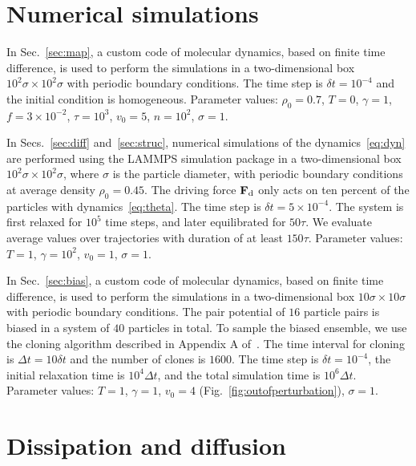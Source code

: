 \documentclass[superscriptaddress, twocolumn, prx, longbibliography, nofootinbib]{revtex4-1}
\begin{document}


\appendix

\section{Numerical simulations}\label{app:simu}

In Sec.~\ref{sec:map}, a custom code of molecular dynamics, based on finite time difference, is used to perform the simulations in a two-dimensional box $10^2\sigma\times 10^2\sigma$ with periodic boundary conditions. The time step is $\delta t = 10^{-4}$ and the initial condition is homogeneous. Parameter values: $\rho_0=0.7$, $T=0$, $\gamma=1$, $f=3\times 10^{-2}$, $\tau=10^3$, $v_0=5$, $n=10^2$, $\sigma=1$.


In Secs.~\ref{sec:diff} and~\ref{sec:struc}, numerical simulations of the dynamics~\eqref{eq:dyn} are performed using the LAMMPS simulation package in a two-dimensional box $10^2\sigma\times 10^2\sigma$, where $\sigma$ is the particle diameter, with periodic boundary conditions at average density $\rho_0=0.45$. The driving force ${\bf F}_{\rm d}$ only acts on ten percent of the particles with dynamics~\eqref{eq:theta}. The time step is $\delta t = 5\times 10^{-4}$. The system is first relaxed for $10^5$ time steps, and later equilibrated for $50\tau$. We evaluate average values over trajectories with duration of at least $150\tau$. Parameter values: $T=1$, $\gamma=10^2$, $v_0=1$, $\sigma=1$.


In Sec.~\ref{sec:bias}, a custom code of molecular dynamics, based on finite time difference, is used to perform the simulations in a two-dimensional box $10\sigma\times 10\sigma$ with periodic boundary conditions. The pair potential of $16$ particle pairs is biased in a system of $40$ particles in total. To sample the biased ensemble, we use the cloning algorithm described in Appendix A of~\cite{Nemoto2016}. The time interval for cloning is $\Delta t = 10 \delta t$ and the number of clones is $1600$. The time step is $\delta t = 10^{-4}$, the initial relaxation time is $10^4\Delta t$, and the total simulation time is $10^6 \Delta t$. Parameter values: $T=1$, $\gamma=1$, $v_0=4$ (Fig.~\ref{fig:outofperturbation}), $\sigma=1$.




\section{Dissipation and diffusion}\label{app:diff}
\end{document}
